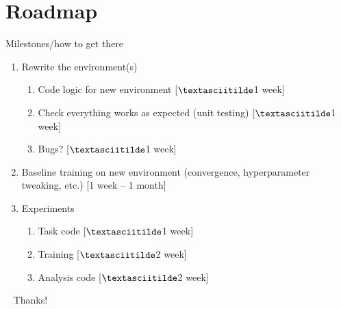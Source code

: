 \documentclass[bigger]{beamer}
\begin{document}
\section{Roadmap }
\label{sec:org61e243e}
\begin{frame}[<+->][label={sec:orgacec153}]{Milestones/how to get there}
\begin{enumerate}
\item Rewrite the environment(s) 
\begin{enumerate}
\item Code logic for new environment \colorbox{black!15!white}{[$\textasciitilde$1 week]}
\item Check everything works as expected (unit testing) \colorbox{black!15!white}{[$\textasciitilde$1 week]}
\item Bugs? \colorbox{black!15!white}{[$\textasciitilde$1 week]}
\end{enumerate}
\item Baseline training on new environment (convergence, hyperparameter tweaking, etc.)  \colorbox{black!15!white}{[1 week -- 1 month]}
\item Experiments
\begin{enumerate}
\item Task code  \colorbox{black!15!white}{[$\textasciitilde$1 week]}
\item Training  \colorbox{black!15!white}{[$\textasciitilde$2 week]}
\item Analysis code  \colorbox{black!15!white}{[$\textasciitilde$2 week]}
\end{enumerate}
\end{enumerate}
\end{frame}
\begin{frame}[label={sec:orged85e83},standout]{~}
Thanks!
\end{frame}
\end{document}
